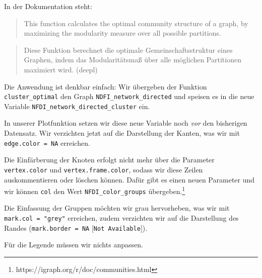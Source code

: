 \documentclass[11pt]{article}
\begin{document}
In der Dokumentation steht:

\begin{quote}
This function calculates the optimal community structure of a graph, by
maximizing the modularity measure over all possible partitions.
\end{quote}

\begin{quote}
Diese Funktion berechnet die optimale Gemeinschaftsstruktur eines
Graphen, indem das Modularitätsmaß über alle möglichen Partitionen
maximiert wird. (deepl)
\end{quote}

Die Anwendung ist denkbar einfach: Wir übergeben der Funktion
\texttt{cluster\_optimal} den Graph \texttt{NDFI\_network\_directed} und
speisen es in die neue Variable
\texttt{NFDI\_network\_directed\_cluster} ein.

In unserer Plotfunktion setzen wir diese neue Variable noch \emph{vor}
den bisherigen Datensatz. Wir verzichten jetzt auf die Darstellung der
Kanten, was wir mit \texttt{edge.color\ =\ NA} erreichen.

Die Einfärberung der Knoten erfolgt nicht mehr über die Parameter
\texttt{vertex.color} und \texttt{vertex.frame.color}, sodass wir diese
Zeilen auskommentieren oder löschen können. Dafür gibt es einen neuen
Parameter und wir können \texttt{col} den Wert
\texttt{NFDI\_color\_groups} übergeben.\footnote{https://igraph.org/r/doc/communities.html}

Die Einfassung der Gruppen möchten wir grau hervorheben, was wir mit
\texttt{mark.col\ =\ "grey"} erreichen, zudem verzichten wir auf die
Darstellung des Randes (\texttt{mark.border\ =\ NA}
{[}\texttt{Not\ Available}{]}).

Für die Legende müssen wir nichts anpassen.
\end{document}
